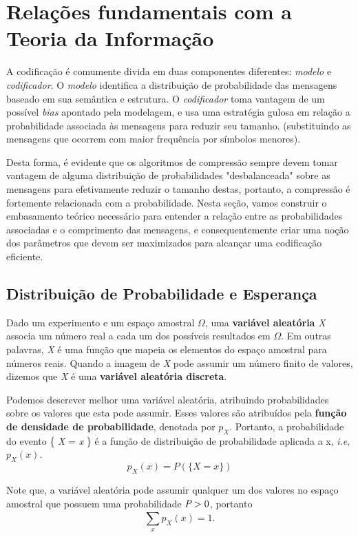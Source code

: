\section{Relações fundamentais com a Teoria da Informação}
A codificação é comumente divida em duas componentes diferentes: \emph{modelo} e \emph{codificador}. O \emph{modelo} identifica a distribuição de probabilidade das mensagens baseado em sua semântica e estrutura. O \emph{codificador} toma vantagem de um possível \emph{bias} apontado pela modelagem, e usa uma estratégia gulosa em relação a probabilidade associada às mensagens para reduzir seu tamanho. (substituindo as mensagens que ocorrem com maior frequência por símbolos menores).

Desta forma, é evidente que os algoritmos de compressão sempre devem tomar vantagem de alguma distribuição de probabilidades "desbalanceada" sobre as mensagens para efetivamente reduzir o tamanho destas, portanto, a compressão é fortemente relacionada com a probabilidade. Nesta seção, vamos construir o embasamento teórico necessário para entender a relação entre as probabilidades associadas e o comprimento das mensagens, e consequentemente criar uma noção dos parâmetros que devem ser maximizados para alcançar uma codificação eficiente.

\subsection{Distribuição de Probabilidade e Esperança}
Dado um experimento e um espaço amostral $\Omega$, uma \textbf{variável aleatória} \emph{X} associa um número real a cada um dos possíveis resultados em $\Omega$. Em outras palavras, \emph{X} é uma função que mapeia os elementos do espaço amostral para números reais. Quando a imagem de \emph{X} pode assumir um número finito de valores, dizemos que \emph{X} é uma \textbf{variável aleatória discreta}.

Podemos descrever melhor uma variável aleatória, atribuindo probabilidades sobre os valores que esta pode assumir. Esses valores são atribuídos pela \textbf{função de densidade de probabilidade}, denotada por \emph{$p_X$}. Portanto, a probabilidade do evento \{ \emph{X} = \emph{x} \} é a função de distribuição de probabilidade aplicada a x, \emph{i.e}, \emph{$p_X(x)$}.
\begin{equation} \label{eq:dist_prob_def}
p_X(x) = P(\{X = x\})
\end{equation}

Note que, a variável aleatória pode assumir qualquer um dos valores no espaço amostral que possuem uma probabilidade $\emph{P} > 0$, portanto
\begin{equation} \label{eq:dist_prob_sum}
\sum_{x}^{}p_X(x) = 1.
\end{equation}

